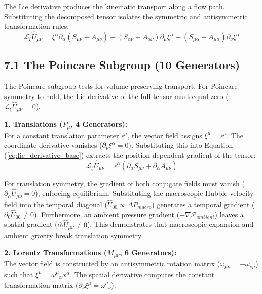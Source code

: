 The Lie derivative produces the kinematic transport along a flow path. Substituting the decomposed tensor isolates the symmetric and antisymmetric transformation rules:
\begin{equation}
    \mathcal{L}_\xi \hat{U}_{\mu\nu} = \xi^\alpha \partial_\alpha (S_{\mu\nu} + A_{\mu\nu}) + (S_{\alpha\nu} + A_{\alpha\nu}) \partial_\mu \xi^\alpha + (S_{\mu\alpha} + A_{\mu\alpha}) \partial_\nu \xi^\alpha \label{eq:lie_derivative_base}
\end{equation}

\subsection*{7.1 The Poincare Subgroup (10 Generators)}
The Poincare subgroup tests for volume-preserving transport. For Poincare symmetry to hold, the Lie derivative of the full tensor must equal zero ($\mathcal{L}_\xi \hat{U}_{\mu\nu} = 0$).

\textbf{1. Translations ($P_\mu$, 4 Generators):} \\
For a constant translation parameter $\epsilon^\mu$, the vector field assigns $\xi^\mu = \epsilon^\mu$. The coordinate derivative vanishes ($\partial_\nu \xi^\alpha = 0$). Substituting this into Equation (\ref{eq:lie_derivative_base}) extracts the position-dependent gradient of the tensor:
\begin{equation}
    \mathcal{L}_\xi \hat{U}_{\mu\nu} = \epsilon^\alpha (\partial_\alpha S_{\mu\nu} + \partial_\alpha A_{\mu\nu})
\end{equation}

For translation symmetry, the gradient of both conjugate fields must vanish ($\partial_\alpha \hat{U}_{\mu\nu} = 0$), enforcing equilibrium. Substituting the macroscopic Hubble velocity field into the temporal diagonal ($\hat{U}_{00} \propto \Delta P_{macro}$) generates a temporal gradient ($\partial_0 \hat{U}_{00} \neq 0$). Furthermore, an ambient pressure gradient ($-\nabla \mathcal{P}_{ambient}$) leaves a spatial gradient ($\partial_i \hat{U}_{\mu\nu} \neq 0$). This demonstrates that macroscopic expansion and ambient gravity break translation symmetry.
    
\textbf{2. Lorentz Transformations ($M_{\mu\nu}$, 6 Generators):} \\
The vector field is constructed by an antisymmetric rotation matrix ($\omega_{\mu\nu} = -\omega_{\nu\mu}$) such that $\xi^\mu = \omega^\mu_{\phantom{\mu}\alpha} x^\alpha$. The spatial derivative computes the constant transformation matrix ($\partial_\nu \xi^\mu = \omega^\mu_{\phantom{\mu}\nu}$).

